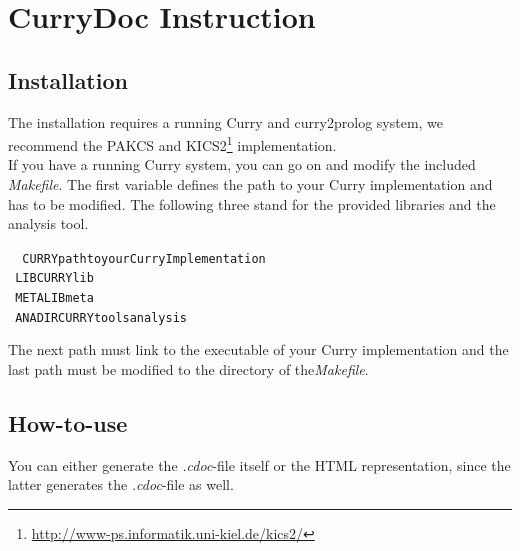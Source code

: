 \documentclass[%
	latex,%
	a4paper,%
	oneside,%
	chapterprefix,%
	headsepline,%
	12pt%
]{scrbook}
\begin{document}


\newpage
{}
\setcounter{page}{\value{roemisch}}

\appendix
\chapter{CurryDoc Instruction}\label{currydoc}
\section{Installation}

The installation requires a running Curry and curry2prolog system, we
recommend the PAKCS and
KICS2\footnote{\url{http://www-ps.informatik.uni-kiel.de/kics2/}}
implementation. \\

If you have a running Curry system, you can go on and modify the
included \emph{Makefile}. %
The first variable defines the path to your Curry implementation and
has to be modified. %
The following three stand for the provided libraries and the analysis
tool. %

\begin{tabbing}\tt
~CURRYpathtoyourCurryImplementation\\
\tt ~LIBCURRYlib\\
\tt ~METALIBmeta\\
\tt ~ANADIRCURRYtoolsanalysis
\end{tabbing}

The next path must link to the executable of your Curry implementation
and the last path must be modified to the directory of
the\emph{Makefile}.

\section{How-to-use}

You can either generate the \emph{.cdoc}-file itself or the HTML
representation, since the latter generates the \emph{.cdoc}-file as well.
 
\end{document}
